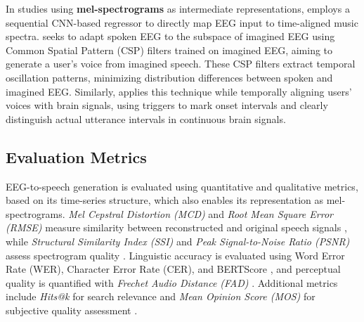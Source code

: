 In studies using \textbf{mel-spectrograms} as intermediate representations, \citet{ramirez2022eeg2mel} employs a sequential CNN-based regressor to directly map EEG input to time-aligned music spectra. \citet{lee2023speech} seeks to adapt spoken EEG to the subspace of imagined EEG using Common Spatial Pattern (CSP) filters trained on imagined EEG, aiming to generate a user's voice from imagined speech. These CSP filters extract temporal oscillation patterns, minimizing distribution differences between spoken and imagined EEG. Similarly, \citet{postolache2024naturalistic} applies this technique while temporally aligning users' voices with brain signals, using triggers to mark onset intervals and clearly distinguish actual utterance intervals in continuous brain signals.

\subsection{Evaluation Metrics}

EEG-to-speech generation is evaluated using quantitative and qualitative metrics, based on its time-series structure, which also enables its representation as mel-spectrograms. \textit{Mel Cepstral Distortion (MCD)} and \textit{Root Mean Square Error (RMSE)} measure similarity between reconstructed and original speech signals \cite{krishna2021advancing, park2024towards}, while \textit{Structural Similarity Index (SSI)} and \textit{Peak Signal-to-Noise Ratio (PSNR)} assess spectrogram quality \cite{ramirez2022eeg2mel}. Linguistic accuracy is evaluated using Word Error Rate (WER), Character Error Rate (CER), and BERTScore \cite{mizuno2024investigation}, and perceptual quality is quantified with \textit{Frechet Audio Distance (FAD)} \cite{postolache2024naturalistic}. Additional metrics include \textit{Hits@k} for search relevance \cite{jiang2024eeg} and \textit{Mean Opinion Score (MOS)} for subjective quality assessment \cite{lee2023towards}.






